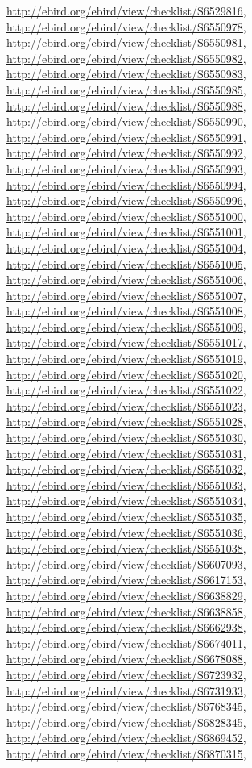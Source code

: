 \documentclass[9pt, article]{memoir}
\begin{document}
\begin{multicols}{2}
\url{http://ebird.org/ebird/view/checklist/S6529816}, 
\url{http://ebird.org/ebird/view/checklist/S6550978}, 
\url{http://ebird.org/ebird/view/checklist/S6550981}, 
\url{http://ebird.org/ebird/view/checklist/S6550982}, 
\url{http://ebird.org/ebird/view/checklist/S6550983}, 
\url{http://ebird.org/ebird/view/checklist/S6550985}, 
\url{http://ebird.org/ebird/view/checklist/S6550988}, 
\url{http://ebird.org/ebird/view/checklist/S6550990}, 
\url{http://ebird.org/ebird/view/checklist/S6550991}, 
\url{http://ebird.org/ebird/view/checklist/S6550992}, 
\url{http://ebird.org/ebird/view/checklist/S6550993}, 
\url{http://ebird.org/ebird/view/checklist/S6550994}, 
\url{http://ebird.org/ebird/view/checklist/S6550996}, 
\url{http://ebird.org/ebird/view/checklist/S6551000}, 
\url{http://ebird.org/ebird/view/checklist/S6551001}, 
\url{http://ebird.org/ebird/view/checklist/S6551004}, 
\url{http://ebird.org/ebird/view/checklist/S6551005}, 
\url{http://ebird.org/ebird/view/checklist/S6551006}, 
\url{http://ebird.org/ebird/view/checklist/S6551007}, 
\url{http://ebird.org/ebird/view/checklist/S6551008}, 
\url{http://ebird.org/ebird/view/checklist/S6551009}, 
\url{http://ebird.org/ebird/view/checklist/S6551017}, 
\url{http://ebird.org/ebird/view/checklist/S6551019}, 
\url{http://ebird.org/ebird/view/checklist/S6551020}, 
\url{http://ebird.org/ebird/view/checklist/S6551022}, 
\url{http://ebird.org/ebird/view/checklist/S6551023}, 
\url{http://ebird.org/ebird/view/checklist/S6551028}, 
\url{http://ebird.org/ebird/view/checklist/S6551030}, 
\url{http://ebird.org/ebird/view/checklist/S6551031}, 
\url{http://ebird.org/ebird/view/checklist/S6551032}, 
\url{http://ebird.org/ebird/view/checklist/S6551033}, 
\url{http://ebird.org/ebird/view/checklist/S6551034}, 
\url{http://ebird.org/ebird/view/checklist/S6551035}, 
\url{http://ebird.org/ebird/view/checklist/S6551036}, 
\url{http://ebird.org/ebird/view/checklist/S6551038}, 
\url{http://ebird.org/ebird/view/checklist/S6607093}, 
\url{http://ebird.org/ebird/view/checklist/S6617153}, 
\url{http://ebird.org/ebird/view/checklist/S6638829}, 
\url{http://ebird.org/ebird/view/checklist/S6638858}, 
\url{http://ebird.org/ebird/view/checklist/S6662938}, 
\url{http://ebird.org/ebird/view/checklist/S6674011}, 
\url{http://ebird.org/ebird/view/checklist/S6678088}, 
\url{http://ebird.org/ebird/view/checklist/S6723932}, 
\url{http://ebird.org/ebird/view/checklist/S6731933}, 
\url{http://ebird.org/ebird/view/checklist/S6768345}, 
\url{http://ebird.org/ebird/view/checklist/S6828345}, 
\url{http://ebird.org/ebird/view/checklist/S6869452}, 
\url{http://ebird.org/ebird/view/checklist/S6870315}, 

\end{multicols}
\end{document}
